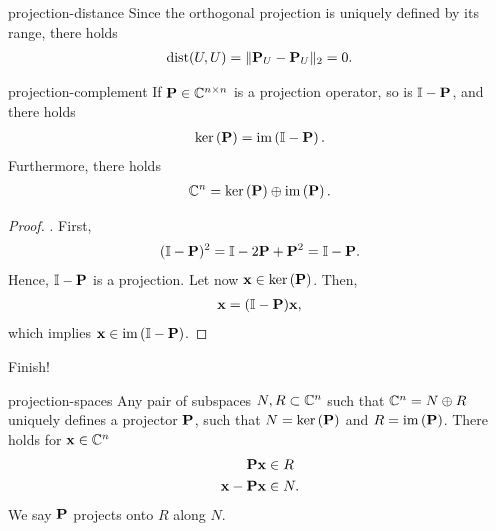 \begin{Example}{projection-distance}
  Since the orthogonal projection is uniquely defined by its range, there holds
  \begin{gather}
    \operatorname{dist}(U,U) = \lVert\mathbf P_U-\mathbf P_U\rVert_2 = 0.
  \end{gather}
\end{Example}



\begin{Lemma}{projection-complement}
  If $\mathbf P\in\mathbb C^{n\times n}$ is a projection operator, so is
  $\mathbb I-\mathbf P$, and there holds
  \begin{gather}
    \operatorname{ker}\left(\mathbf P\right) = \operatorname{im}\left(\mathbb I-\mathbf P\right).
  \end{gather}
  Furthermore, there holds
  \begin{gather}
    \mathbb C^n = \operatorname{ker}\left(\mathbf P\right) \oplus \operatorname{im}\left(\mathbf P\right).
  \end{gather}
\end{Lemma}

\begin{proof}
  \cite[Section 1.12.1]{Saad00}. First,
  \begin{gather}
    (\mathbb I-\mathbf P)^2 = \mathbb I-2\mathbf P+\mathbf P^2 = \mathbb I-\mathbf P.
  \end{gather}
  Hence, $\mathbb I-\mathbf P$ is a projection. Let now $\mathbf x\in\operatorname{ker}\left(\mathbf P\right)$. Then,
  \begin{gather}
    \mathbf x=(\mathbb I-\mathbf P)\mathbf x,
  \end{gather}
  which implies $\mathbf x\in\operatorname{im}\left(\mathbb I-\mathbf P\right)$.
\end{proof}

\begin{todo}
  Finish!
\end{todo}

\begin{Lemma}{projection-spaces}
  Any pair of subspaces $N,R\subset \mathbb C^n$ such that $\mathbb C^n = N\oplus R$
  uniquely defines a projector $\mathbf P$, such that $N = \operatorname{ker}\left(\mathbf P\right)$ and
  $R=\operatorname{im}\left(\mathbf P\right)$. There holds for $\mathbf x\in\mathbb C^n$
  \begin{align}
    \mathbf P \mathbf x &\in R\\
    \mathbf x - \mathbf P \mathbf x &\in N.
  \end{align}
  We say $\mathbf P$ projects onto $R$ along $N$.
\end{Lemma}


